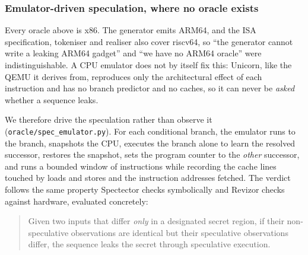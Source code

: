 \documentclass[conference]{IEEEtran}
\begin{document}
\subsubsection{Emulator-driven speculation, where no oracle exists}
\label{sec:specemu}

Every oracle above is x86. The generator emits ARM64, and the ISA
specification, tokeniser and realiser also cover riscv64, so ``the generator
cannot write a leaking ARM64 gadget'' and ``we have no ARM64 oracle'' were
indistinguishable. A CPU emulator does not by itself fix this: Unicorn, like
the QEMU it derives from, reproduces only the architectural effect of each
instruction and has no branch predictor and no caches, so it can never be
\emph{asked} whether a sequence leaks.

We therefore drive the speculation rather than observe it
(\texttt{oracle/spec\_emulator.py}). For each conditional branch, the emulator
runs to the branch, snapshots the CPU, executes the branch alone to learn the
resolved successor, restores the snapshot, sets the program counter to the
\emph{other} successor, and runs a bounded window of instructions while
recording the cache lines touched by loads and stores and the instruction
addresses fetched. The verdict follows the same property Spectector checks
symbolically and Revizor checks against hardware, evaluated concretely:

\begin{quote}
Given two inputs that differ \emph{only} in a designated secret region, if
their non-speculative observations are identical but their speculative
observations differ, the sequence leaks the secret through speculative
execution.
\end{quote}
\end{document}

